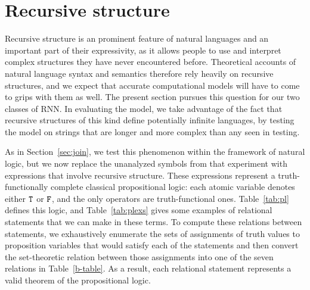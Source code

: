 \section{Recursive structure}\label{sec:recursion}


Recursive structure is an prominent feature of natural languages and
an important part of their expressivity, as it allows people to use
and interpret complex structures they have never encountered before.
Theoretical accounts of natural language syntax and semantics
therefore rely heavily on recursive structures, and we expect that
accurate computational models will have to come to grips with them as
well. The present section pursues this question for our two classes of
RNN. In evaluating the model, we take advantage of the fact that
recursive structures of this kind define potentially infinite
languages, by testing the model on strings that are longer and more
complex than any seen in testing.


As in Section~\ref{sec:join}, we test this phenomenon within the
framework of natural logic, but we now replace the unanalyzed symbols
from that experiment with expressions that involve recursive
structure. These expressions represent a truth-functionally complete classical
propositional logic: each atomic variable denotes either $\texttt{T}$ or
$\texttt{F}$, and the only operators are truth-functional ones.
Table~\ref{tab:pl} defines this logic, and Table~\ref{tab:plexs} gives
some examples of relational statements that we can make
in these terms. To compute these relations between statements, we
exhaustively enumerate the sets of assignments of truth values to
proposition variables that would satisfy each of the statements and
then convert the set-theoretic relation between those assignments into
one of the seven relations in Table~\ref{b-table}. As a result, each relational
statement represents a valid theorem of the propositional logic.

